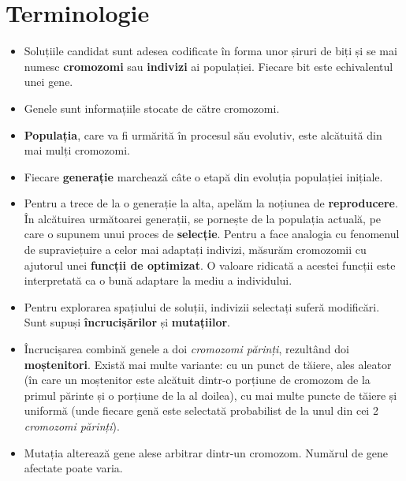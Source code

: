 \section{Terminologie}

\begin{itemize}
	
	 \item Soluțiile candidat sunt adesea codificate în forma unor șiruri de biți și se mai numesc \textbf{cromozomi} sau \textbf{indivizi} ai populației. Fiecare bit este echivalentul unei gene. 
	 
	 \item Genele sunt informațiile stocate de către cromozomi. 
	 
	 \item \textbf{Populația}, care va fi urmărită în procesul său evolutiv, este alcătuită din mai mulți cromozomi. 
	 
	 \item Fiecare \textbf{generație} marchează câte o etapă din evoluția populației inițiale. 
	 
	 \item Pentru a trece de la o generație la alta, apelăm la noțiunea de \textbf{reproducere}. În alcătuirea următoarei generații, se pornește de la populația actuală, pe care o supunem unui proces de \textbf{selecție}. Pentru a face analogia cu fenomenul de supraviețuire a celor mai adaptați indivizi, măsurăm cromozomii cu ajutorul unei \textbf{funcții de optimizat}. O valoare ridicată a acestei funcții este interpretată ca o bună adaptare la mediu a individului.  
	 
	 \item Pentru explorarea spațiului de soluții, indivizii selectați suferă modificări. Sunt supuși \textbf{încrucișărilor} și \textbf{mutațiilor}. 
	 
	 \item Încrucișarea combină genele a doi \textit{cromozomi părinți}, rezultând doi \textbf{moștenitori}. Există mai multe variante: cu un punct de tăiere, ales aleator (în care un moștenitor este alcătuit dintr-o porțiune de cromozom de la primul părinte și o porțiune de la al doilea), cu mai multe puncte de tăiere și uniformă (unde fiecare genă este selectată probabilist de la unul din cei 2 \textit{cromozomi părinți}). 
	 
	 \item Mutația alterează gene alese arbitrar dintr-un cromozom. Numărul de gene afectate poate varia. 
	
\end{itemize}

